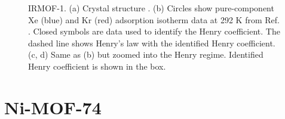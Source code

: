     \begin{figure}[h!]
       \centering
  
       
       \caption{IRMOF-1. (a) Crystal structure \cite{IRMOF-1_structure}.
       (b) Circles show pure-component Xe (blue) and Kr (red) adsorption isotherm data at 292 K from Ref. \cite{IRMOF-1_XeKr}. 
       Closed symbols are data used to identify the Henry coefficient. The dashed line shows Henry's law with the identified Henry coefficient.
       (c, d) Same as (b) but zoomed into the Henry regime. Identified Henry coefficient is shown in the box.}
    \end{figure}
    
    \clearpage
    
    
    \section{Ni-MOF-74}
    
